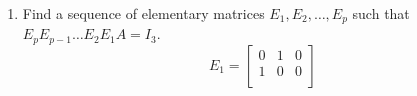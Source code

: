 \documentclass[../main.tex]{subfiles}
\begin{document}
{\begin{enumerate} [label=(\alph*)]
\begin{align*}
\begin{array}{ccc;{2pt/2pt}ccc}
            0 & 1 & 2 & 1 & 0 & 0\\
            0 & 0 & 2 & 3 & -4 & 1\\
          \end{array}
          \right]       \\
          \xrightarrow[r_2-r_3]{}
          \left[
          \begin{array}{ccc;{2pt/2pt}ccc}  
            1 & 0 & 3 & 0 & 1 & 0\\
            0 & 1 & 0 & -2 & 4 & -1\\
            0 & 0 & 2 & 3 & -4 & 1\\
          \end{array}
          \right] \xrightarrow[r_3 \times  \frac{1}{2}]{}
          \left[
          \begin{array}{ccc;{2pt/2pt}ccc}  
            1 & 0 & 3 & 0 & 1 & 0\\
            0 & 1 & 0 & -2 & 4 & -1\\
            0 & 0 & 1 & \frac{3}{2} & -2 & \frac{1}{2}\\
          \end{array}
          \right]\\
          \xrightarrow[r_1-3r_2]{}
          \left[
          \begin{array}{ccc;{2pt/2pt}ccc}  
            1 & 0 & 0 & -\frac{9}{2} & 7 & -\frac{3}{2}\\
            0 & 1 & 0 & -2 & 4 & -1\\
            0 & 0 & 1 & \frac{3}{2} & -2 & \frac{1}{2}\\
          \end{array}
          \right] \implies A^{-1}= \begin{bmatrix}
          - \frac{9}{2} & 7 & - \frac{3}{2}\\
          -2 & 4 & -1\\
          \frac{3}{2} & -2 & \frac{1}{2}\\
          \end{bmatrix}\\
  .\end{align*}
  \item  Find a sequence of elementary matrices $E_1,E_2,\ldots, E_p$ such that $E_p E_{p-1}\ldots E_2E_1A =I_3$.\\
          \[
          E_1 = \begin{bmatrix}
          0 & 1 & 0\\
          1 & 0 & 0\\

\end{bmatrix}\]
\end{enumerate}}
\end{document}
